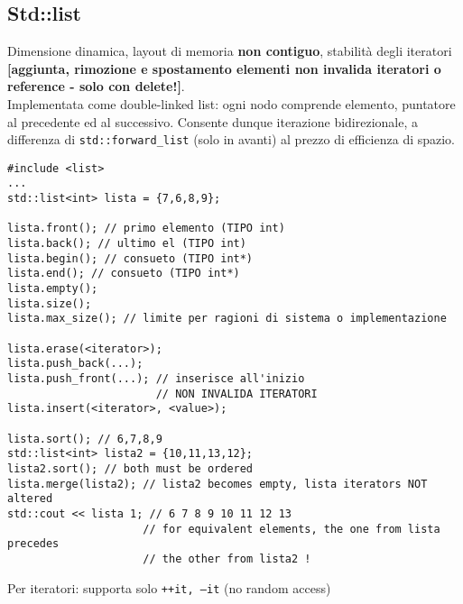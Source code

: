 \documentclass[10pt, oneside]{Book}
\begin{document}
\subsection{Std::list}
Dimensione dinamica, layout di memoria \textbf{non contiguo}, stabilità degli iteratori \textbf{[aggiunta, rimozione e spostamento elementi non invalida iteratori o reference - solo con delete!]}.
\\Implementata come double-linked list: ogni nodo comprende elemento, puntatore al precedente ed al successivo. Consente dunque iterazione bidirezionale, a differenza di \texttt{std::forward\_list} (solo in avanti) al prezzo di efficienza di spazio.
\begin{verbatim}
#include <list>
...
std::list<int> lista = {7,6,8,9};

lista.front(); // primo elemento (TIPO int)
lista.back(); // ultimo el (TIPO int)
lista.begin(); // consueto (TIPO int*)
lista.end(); // consueto (TIPO int*)
lista.empty();
lista.size();
lista.max_size(); // limite per ragioni di sistema o implementazione

lista.erase(<iterator>);
lista.push_back(...);
lista.push_front(...); // inserisce all'inizio
                       // NON INVALIDA ITERATORI
lista.insert(<iterator>, <value>);

lista.sort(); // 6,7,8,9
std::list<int> lista2 = {10,11,13,12};
lista2.sort(); // both must be ordered
lista.merge(lista2); // lista2 becomes empty, lista iterators NOT altered
std::cout << lista 1; // 6 7 8 9 10 11 12 13
                     // for equivalent elements, the one from lista precedes
                     // the other from lista2 !
\end{verbatim}
Per iteratori: supporta solo \texttt{++it, --it} (no random access)
\end{document}
